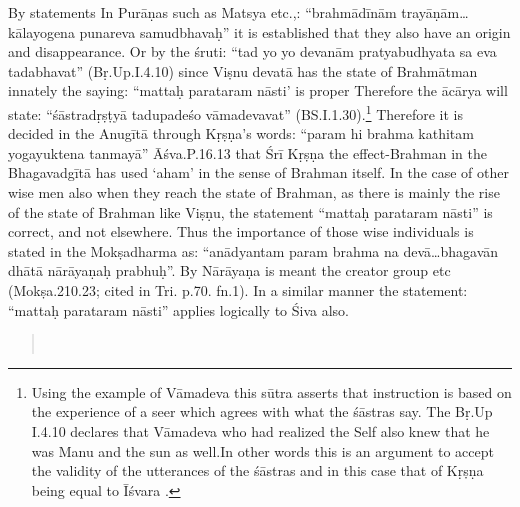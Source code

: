 By statements In Purāṇas such as Matsya etc.,: “brahmādīnām trayāṇām…kālayogena punareva samudbhavaḥ” it is established that they also have an origin and disappearance. Or by the śruti: “tad yo yo devanām pratyabudhyata sa eva tadabhavat” (Bṛ.Up.I.4.10)  since Viṣnu devatā has the state of Brahmātman innately the saying: “mattaḥ parataram nāsti’ is proper Therefore the ācārya will state: “śāstradṛṣṭyā tadupadeśo vāmadevavat” (BS.I.1.30).\footnote{Using the example of Vāmadeva this sūtra asserts that instruction is based on the experience of a seer which agrees with what the śāstras say. The Bṛ.Up I.4.10 declares that Vāmadeva who had realized the Self also knew that he was Manu and the sun as well.In other words this is an argument to accept the validity of the utterances of the śāstras and in this case that of Kṛṣṇa being equal to Īśvara .} Therefore it is decided in the Anugītā through Kṛṣṇa’s words: “param hi brahma kathitam yogayuktena tanmayā” Āśva.P.16.13 that Śrī Kṛṣṇa the effect-Brahman in the Bhagavadgītā has used ‘aham’ in the sense of Brahman itself. In the case of other wise men also when they reach the state of Brahman, as there is mainly the rise of the state of Brahman like Viṣṇu, the statement “mattaḥ parataram nāsti” is correct, and not elsewhere. Thus the importance of those wise individuals is stated in the Mokṣadharma as: “anādyantam param brahma na devā…bhagavān dhātā nārāyaṇaḥ prabhuḥ”. By Nārāyaṇa is meant the creator group etc (Mokṣa.210.23; cited in Tri. p.70. fn.1). In a similar manner the statement: “mattaḥ parataram nāsti” applies logically to Śiva also.


\begin{verse}
\\
\end{verse}

